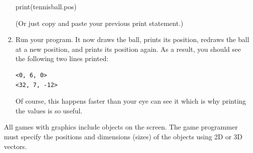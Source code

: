 \begin{enumerate}
\begin{myvpython}
print(tennisball.pos)
\end{myvpython}

(Or just copy and paste your previous print statement.)

	\item Run your program. It now draws the ball, prints its position, redraws the ball at a new position, and prints its position again. As a result, you should see the following two lines printed:
	
\begin{verbatim}
<0, 6, 0>
<32, 7, -12>
\end{verbatim}
	
	Of course, this happens faster than your eye can see it which is why printing the values is so useful.

\end{enumerate}

\analysis

All games with graphics include objects on the screen. The game programmer must specify the positions and dimensions (sizes) of the objects using 2D or 3D vectors.

